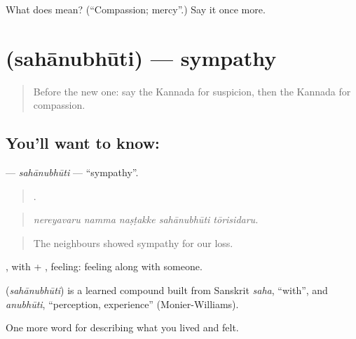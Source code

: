 \begin{tcolorbox}[breakable,colback=teal!4,colframe=teal!35!black,title={Before you move on}]
What does  mean? (\textquotedblleft{}Compassion; mercy\textquotedblright{}.) Say it once more.
\end{tcolorbox}
\section[\texorpdfstring{\kn{ಸಹಾನುಭೂತಿ} (sahānubhūti)}{ಸಹಾನುಭೂತಿ (sahānubhūti)}]{ (sahānubhūti) — sympathy}

\label{lesson:KA-C498-sahanubhuti}



\begin{quote}
Before the new one: say the Kannada for suspicion, then the Kannada for compassion.
\end{quote}

\subsection*{You'll want to know: }
\textbf{} — \emph{sahānubhūti} — \textquotedblleft{}sympathy\textquotedblright{}.

\begin{quote}
    .
\end{quote}

\begin{quote}
\emph{nereyavaru namma naṣṭakke sahānubhūti tōrisidaru.}
\end{quote}

\begin{quote}
The neighbours showed sympathy for our loss.
\end{quote}

, with + , feeling: feeling along with someone.

\begin{cousinweb}
\textbf{} (\emph{sahānubhūti}) is a learned compound built from Sanskrit \emph{saha}, \textquotedblleft{}with\textquotedblright{}, and \emph{anubhūti}, \textquotedblleft{}perception, experience\textquotedblright{} (Monier-Williams).
\end{cousinweb}

\begin{grammarlens}[title={What you've built}]
One more word for describing what you lived and felt.
\end{grammarlens}

